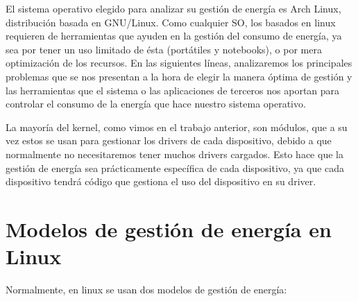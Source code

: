 \documentclass[12pt, spanish]{article}
\begin{document}
El sistema operativo elegido para analizar su gestión de energía es Arch Linux, distribución basada en GNU/Linux. Como cualquier SO, los basados en linux requieren de herramientas que ayuden en la gestión del consumo de energía, ya sea por tener un uso limitado de ésta (portátiles y notebooks), o por mera optimización de los recursos. En las siguientes líneas, analizaremos los principales problemas que se nos presentan a la hora de elegir la manera óptima de gestión y las herramientas que el sistema o las aplicaciones de terceros nos aportan para controlar el consumo de la energía que hace nuestro sistema operativo. 


La mayoría del kernel, como vimos en el trabajo anterior, son módulos, que a su vez estos se usan para gestionar los drivers de cada dispositivo, debido a que normalmente no necesitaremos tener muchos drivers cargados. Esto hace que la gestión de energía sea prácticamente específica de cada dispositivo, ya que cada dispositivo tendrá código que gestiona el uso del dispositivo en su driver.


\section{Modelos de gestión de energía en Linux}

Normalmente, en linux se usan dos modelos de gestión de energía:
\end{document}
